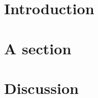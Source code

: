 \documentclass[useAMS,usenatbib,twocolumn]{mnras}
\begin{document}


\section{Introduction}



\section{A section}\label{thissection}




\section{Discussion}\label{discussion}
\end{document}
